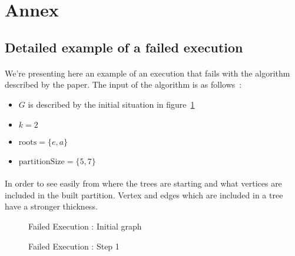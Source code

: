 \section*{Annex}

\subsection{Detailed example of a failed execution}

\paragraph{}
We're presenting here an example of an execution that fails with the algorithm
described by the paper. The input of the algorithm is as follows~:
\begin{itemize}
\item $G$ is described by the initial situation in figure~\ref{FE_K2_init}
\item $k = 2$
\item $\mathrm{roots} = \{ e, a \}$
\item $\mathrm{partitionSize} = \{ 5, 7\}$
\end{itemize}

\paragraph{}
In order to see easily from where the trees are starting and what vertices are
included in the built partition. Vertex and edges which are included in a tree
have a stronger thickness.

\begin{figure}[H]
  \caption{\label{FE_K2_init}Failed Execution : Initial graph}
  \begin{center}
    \begin{tikzpicture}[scale=0.9,transform shape]
      
    \end{tikzpicture}
  \end{center}
\end{figure}

\begin{figure}[H]
  \caption{Failed Execution : Step 1}
  \begin{center}
    \begin{tikzpicture}[scale=0.9,transform shape]
      
    \end{tikzpicture}
  \end{center}
\end{figure}


